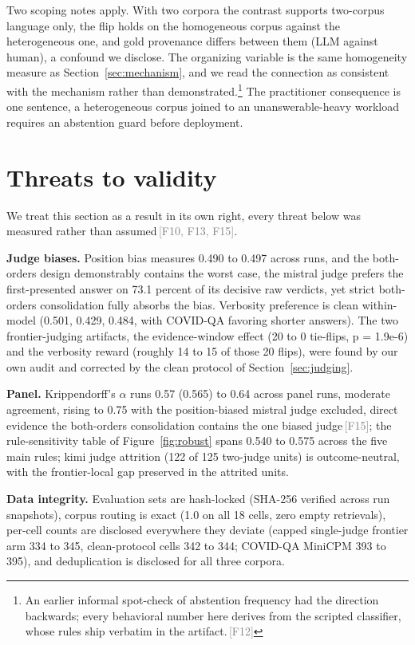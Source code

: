 \documentclass[11pt]{article}
\newcommand{\rcpt}[1]{\textcolor{gray}{\,\textsf{\scriptsize[#1]}}}
\begin{document}
Two scoping notes apply. With two corpora the contrast supports two-corpus language only, the flip holds on the homogeneous corpus against the heterogeneous one, and gold provenance differs between them (LLM against human), a confound we disclose. The organizing variable is the same homogeneity measure as Section~\ref{sec:mechanism}, and we read the connection as consistent with the mechanism rather than demonstrated.\footnote{An earlier informal spot-check of abstention frequency had the direction backwards; every behavioral number here derives from the scripted classifier, whose rules ship verbatim in the artifact.\rcpt{F12}} The practitioner consequence is one sentence, a heterogeneous corpus joined to an unanswerable-heavy workload requires an abstention guard before deployment.

\section{Threats to validity}
\label{sec:threats}

We treat this section as a result in its own right, every threat below was measured rather than assumed\rcpt{F10, F13, F15}.

\textbf{Judge biases.} Position bias measures 0.490 to 0.497 across runs, and the both-orders design demonstrably contains the worst case, the mistral judge prefers the first-presented answer on 73.1 percent of its decisive raw verdicts, yet strict both-orders consolidation fully absorbs the bias. Verbosity preference is clean within-model (0.501, 0.429, 0.484, with COVID-QA favoring shorter answers). The two frontier-judging artifacts, the evidence-window effect (20 to 0 tie-flips, p = 1.9e-6) and the verbosity reward (roughly 14 to 15 of those 20 flips), were found by our own audit and corrected by the clean protocol of Section~\ref{sec:judging}.

\textbf{Panel.} Krippendorff's $\alpha$ runs 0.57 (0.565) to 0.64 across panel runs, moderate agreement, rising to 0.75 with the position-biased mistral judge excluded, direct evidence the both-orders consolidation contains the one biased judge\rcpt{F15}; the rule-sensitivity table of Figure~\ref{fig:robust} spans 0.540 to 0.575 across the five main rules; kimi judge attrition (122 of 125 two-judge units) is outcome-neutral, with the frontier-local gap preserved in the attrited units.

\textbf{Data integrity.} Evaluation sets are hash-locked (SHA-256 verified across run snapshots), corpus routing is exact (1.0 on all 18 cells, zero empty retrievals), per-cell counts are disclosed everywhere they deviate (capped single-judge frontier arm 334 to 345, clean-protocol cells 342 to 344; COVID-QA MiniCPM 393 to 395), and deduplication is disclosed for all three corpora.
\end{document}
